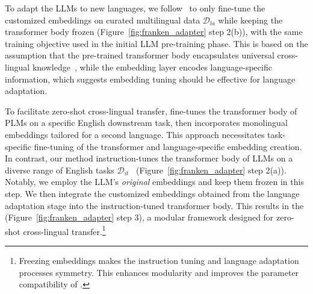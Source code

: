 To adapt the LLMs to new languages, we follow~\citet{artetxe-etal-2020-cross} to only fine-tune the customized embeddings on curated multilingual data $\mathcal{D}_{la}$ while keeping the transformer body frozen (Figure~\ref{fig:franken_adapter} step 2(b)), with the same training objective used in the initial LLM pre-training phase. This is based on the assumption that the pre-trained transformer body encapsulates universal cross-lingual knowledge~\citep{zhao2024how,wendler-etal-2024-llamas,tang-etal-2024-language}, while the embedding layer encodes language-specific information, which suggests embedding tuning should be effective for language adaptation. 

\inlinetitle{\ouradapter}
To facilitate zero-shot cross-lingual transfer, \citet{artetxe-etal-2020-cross} fine-tunes the transformer body of PLMs on a specific English downstream task, then incorporates monolingual embeddings tailored for a second language. This approach necessitates task-specific fine-tuning of the transformer and language-specific embedding creation. In contrast, our \ouradapter method instruction-tunes the transformer body of LLMs on a diverse range of English tasks $\mathcal{D}_{it}$~\citep{wei2022finetuned} (Figure~\ref{fig:franken_adapter} step 2(a)). Notably, we employ the LLM's \emph{original} embeddings and keep them frozen in this step.
We then integrate the customized embeddings obtained from the language adaptation stage into the instruction-tuned transformer body. This results in the \ouradapter (Figure~\ref{fig:franken_adapter} step 3), a modular framework designed for zero-shot cross-lingual transfer.\footnote{Freezing embeddings makes the instruction tuning and language adaptation processes symmetry. This enhances modularity and improves the parameter compatibility of \ouradapter.}


